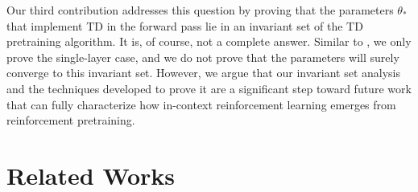\documentclass{article}
\begin{document}
Our third contribution addresses this question by proving that the parameters $\theta_*$ that implement TD in the forward pass lie in an invariant set of the TD pretraining algorithm.
It is, of course, not a complete answer. 
Similar to \citet{wu2023many,zhang2024trained}, we only prove the single-layer case, and we do not prove that the parameters will surely converge to this invariant set.
However, we argue that our invariant set analysis and the techniques developed to prove it are a significant step toward future work that can fully characterize how in-context reinforcement learning emerges from reinforcement pretraining.



\section{Related Works}
\end{document}
